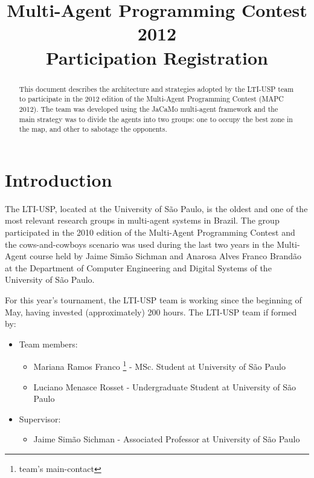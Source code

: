 \documentclass{llncs}
\begin{document}
\title{Multi-Agent Programming Contest 2012\\Participation Registration}
\author{}
\institute{}
\maketitle

\begin{abstract}

  This document describes the architecture and strategies adopted by the
  LTI-USP team to participate in the 2012 edition of the Multi-Agent
  Programming Contest (MAPC 2012). The team was developed using the
  JaCaMo multi-agent framework and the main strategy was to divide
  the agents into two groups: one to occupy the best zone in the map,
  and other to sabotage the opponents.
  

\end{abstract}


\section*{Introduction}

The LTI-USP, located at the University of S\~ao Paulo, is the oldest and
one of the most relevant research groups in multi-agent systems in Brazil.
The group participated in the 2010 edition of the Multi-Agent Programming Contest
and the cows-and-cowboys scenario was used during the last two years in the Multi-Agent
course held by Jaime Sim\~ao Sichman and Anarosa Alves Franco Brand\~ao at the
Department of Computer Engineering and Digital Systems of the University of S\~ao Paulo.

For this year's tournament, the LTI-USP team is working since the beginning of May, having
invested (approximately) 200 hours. The LTI-USP team if formed by:

\begin{itemize}
\item Team members:
	\begin{itemize}
	\item Mariana Ramos Franco \footnote[1]{team's main-contact} - MSc. Student at University of S\~ao Paulo
	\item Luciano Menasce Rosset - Undergraduate Student at University of S\~ao Paulo	
	\end{itemize}
\item Supervisor:
	\begin{itemize}
	\item Jaime Sim\~ao Sichman - Associated Professor at University of S\~ao Paulo\\
	\end{itemize}
\end{itemize}
\end{document}
